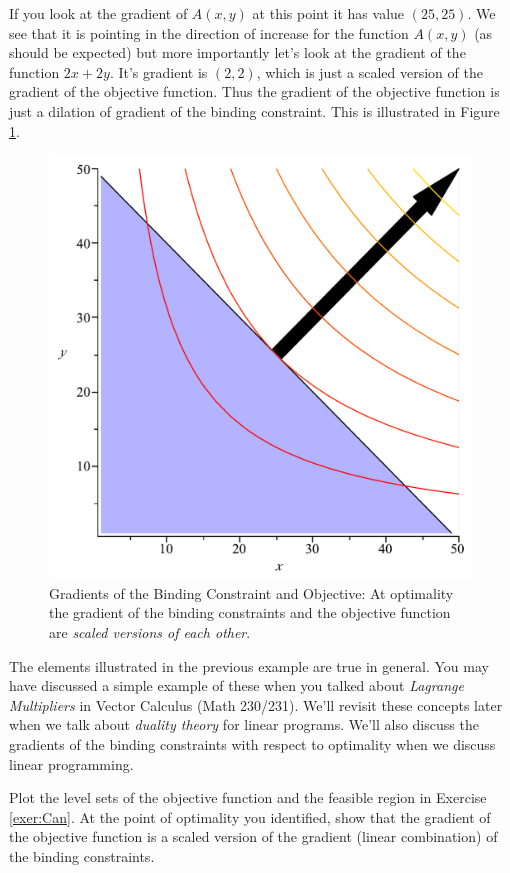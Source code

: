 \begin{example}
If you look at the gradient of $A(x,y)$ at this point it has value $(25,25)$. We see that it is pointing in the direction of increase for the function $A(x,y)$ (as should be expected) but more importantly let's look at the gradient of the function $2x + 2y$. It's gradient is $(2,2)$, which is just a scaled version of the gradient of the objective function. Thus the gradient of the objective function is just a dilation of gradient of the binding constraint. This is illustrated in Figure \ref{fig:Goat2DPlotWithGrad}.
\begin{figure}[htbp]
\centering
\includegraphics[scale=0.35]{GoatConstraintObjectiveWithGrad.pdf}
\caption{Gradients of the Binding Constraint and Objective: At optimality the gradient of the binding constraints and the objective function are \textit{scaled versions of each other}.}
\label{fig:Goat2DPlotWithGrad}
\end{figure}
\end{example}

The elements illustrated in the previous example are true in general. You may have discussed a simple example of these when you talked about \textit{Lagrange Multipliers} in Vector Calculus (Math 230/231). We'll revisit these concepts later when we talk about \textit{duality theory} for linear programs. We'll also discuss the gradients of the binding constraints with respect to optimality when we discuss linear programming. 

\begin{exercise} Plot the level sets of the objective function and the feasible region in Exercise \ref{exer:Can}. At the point of optimality you identified, show that the gradient of the objective function is a scaled version of the gradient (linear combination) of the binding constraints.
\end{exercise}
